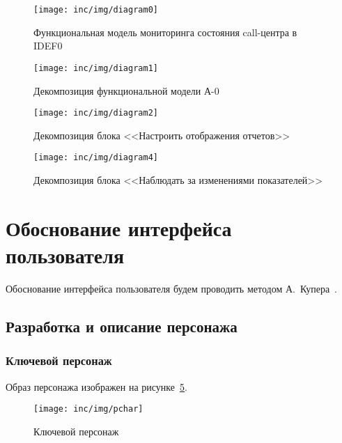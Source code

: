 \begin{figure}[!ht]
    \centering
    \texttt{[image: inc/img/diagram0]}
    \caption{Функциональная модель мониторинга состояния call-центра в IDEF0}
    \label{pic:idef0:a0}
\end{figure}

\begin{figure}[!ht]
    \centering
    \texttt{[image: inc/img/diagram1]}
    \caption{Декомпозиция функциональной модели А-0}
    \label{pic:idef0:a0:decompose}
\end{figure}

\begin{figure}[!ht]
    \centering
    \texttt{[image: inc/img/diagram2]}
    \caption{Декомпозиция блока <<Настроить отображения отчетов>>}
    \label{pic:idef0:a1:decompose}
\end{figure}

\begin{figure}[!ht]
    \centering
    \texttt{[image: inc/img/diagram4]}
    \caption{Декомпозиция блока <<Наблюдать за изменениями показателей>>}
    \label{pic:idef0:a2:decompose}
\end{figure}


\section{Обоснование интерфейса пользователя}

Обоснование интерфейса пользователя будем проводить методом А.~Купера~\cite{cooper2014face}.

\subsection{Разработка и описание персонажа}

\subsubsection{Ключевой персонаж}

Образ персонажа изображен на рисунке~\ref{pic:pcharacter}.

\begin{figure}[!ht]
    \centering
    \texttt{[image: inc/img/pchar]}
    \caption{Ключевой персонаж}
    \label{pic:pcharacter}
\end{figure}

